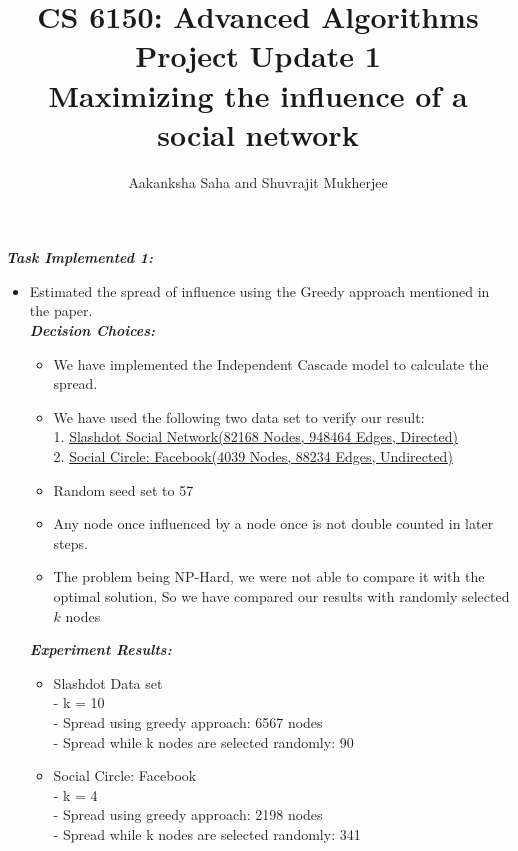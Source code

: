 \documentclass[letterpaper,onecolumn,10pt]{article}
\title{CS 6150: Advanced Algorithms Project Update 1\\
Maximizing the influence of a social network\\}
\author{Aakanksha Saha and Shuvrajit Mukherjee}
\affil{School of Computing, University of Utah}
\begin{document}
\maketitle
\textbf{\textit{Task Implemented 1:}}
\begin{itemize}
\item Estimated the spread of influence using the Greedy approach mentioned in the paper.\\
\textbf{\textit{Decision Choices:}}
\begin{itemize}
\item We have implemented the Independent Cascade model to calculate the spread.
\item We have used the following two data set to verify our result:\\
1. \href{https://snap.stanford.edu/data/soc-Slashdot0902.html}{Slashdot Social Network(82168 Nodes, 948464 Edges, Directed)}\\
2. \href{https://snap.stanford.edu/data/egonets-Facebook.html}{Social Circle: Facebook(4039 Nodes, 88234 Edges, Undirected)}
\item Random seed set to 57
\item Any node once influenced by a node once is not double counted in later steps.
\item The problem being NP-Hard, we were not able to compare it with the optimal solution, So we have compared our results with randomly selected $k$ nodes
\end{itemize}
\textbf{\textit{Experiment Results:}}
\begin{itemize}
\item Slashdot Data set\\
- k = 10\\
- Spread using greedy approach: 6567 nodes \\
- Spread while k nodes are selected randomly: 90\\
\item Social Circle: Facebook\\
- k = 4\\
- Spread using greedy approach: 2198 nodes \\
- Spread while k nodes are selected randomly: 341\\
\end{itemize}
\end{itemize}
\end{document}
